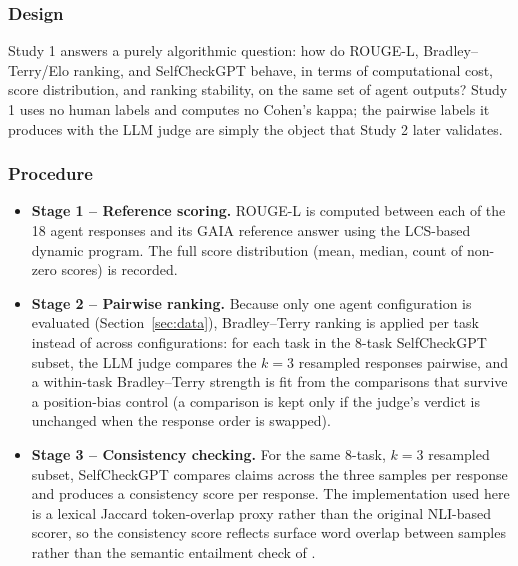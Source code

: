 \documentclass[conference]{IEEEtran}
\begin{document}
\subsubsection{Design}
Study 1 answers a purely algorithmic question: how do ROUGE-L, Bradley--Terry/Elo ranking, and SelfCheckGPT behave, in terms of computational cost, score distribution, and ranking stability, on the same set of agent outputs? Study 1 uses no human labels and computes no Cohen's kappa; the pairwise labels it produces with the LLM judge are simply the object that Study 2 later validates.

\subsubsection{Procedure}
\begin{itemize}
\item \textbf{Stage 1 -- Reference scoring.} ROUGE-L is computed between each of the 18 agent responses and its GAIA reference answer using the LCS-based dynamic program. The full score distribution (mean, median, count of non-zero scores) is recorded.
\item \textbf{Stage 2 -- Pairwise ranking.} Because only one agent configuration is evaluated (Section~\ref{sec:data}), Bradley--Terry ranking is applied per task instead of across configurations: for each task in the 8-task SelfCheckGPT subset, the LLM judge compares the $k=3$ resampled responses pairwise, and a within-task Bradley--Terry strength is fit from the comparisons that survive a position-bias control (a comparison is kept only if the judge's verdict is unchanged when the response order is swapped).
\item \textbf{Stage 3 -- Consistency checking.} For the same 8-task, $k=3$ resampled subset, SelfCheckGPT compares claims across the three samples per response and produces a consistency score per response. The implementation used here is a lexical Jaccard token-overlap proxy rather than the original NLI-based scorer, so the consistency score reflects surface word overlap between samples rather than the semantic entailment check of \cite{manakul2023selfcheckgpt}.
\end{itemize}
\end{document}
